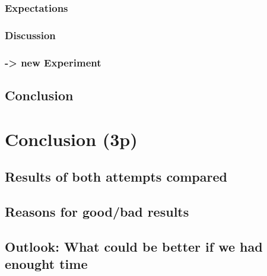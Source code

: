 \documentclass[
	11pt,
	notitlepage,
	oneside
]{scrartcl}
\begin{document}
\subsubsection{Expectations}
\subsubsection{Discussion}
\subsubsection{-> new Experiment}
\subsection{Conclusion}

\section{Conclusion (3p)}
\subsection{Results of both attempts compared}
\subsection{Reasons for good/bad results}
\subsection{Outlook: What could be better if we had enought time}
\end{document}
